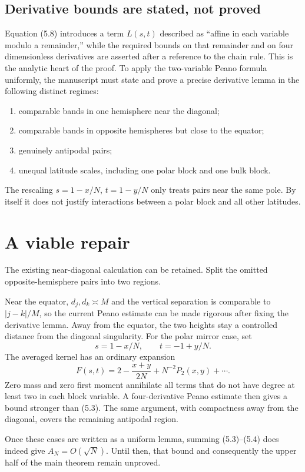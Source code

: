 \documentclass[11pt]{article}
\begin{document}
\subsection{Derivative bounds are stated, not proved}

Equation (5.8) introduces a term $L(s,t)$ described as ``affine in each
variable modulo a remainder,'' while the required bounds on that remainder
and on four dimensionless derivatives are asserted after a reference to the
chain rule.  This is the analytic heart of the proof.  To apply the
two-variable Peano formula uniformly, the manuscript must state and prove a
precise derivative lemma in the following distinct regimes:
\begin{enumerate}
\item comparable bands in one hemisphere near the diagonal;
\item comparable bands in opposite hemispheres but close to the equator;
\item genuinely antipodal pairs;
\item unequal latitude scales, including one polar block and one bulk block.
\end{enumerate}
The rescaling $s=1-x/N$, $t=1-y/N$ only treats pairs near the same pole.  By
itself it does not justify interactions between a polar block and all other
latitudes.

\section{A viable repair}

The existing near-diagonal calculation can be retained.  Split the omitted
opposite-hemisphere pairs into two regions.

Near the equator, $d_j,d_k\asymp M$ and the vertical separation is comparable
to $|j-k|/M$, so the current Peano estimate can be made rigorous after fixing
the derivative lemma.  Away from the equator, the two heights stay a
controlled distance from the diagonal singularity.  For the polar mirror
case, set
\[
 s=1-x/N,\qquad t=-1+y/N.
\]
The averaged kernel has an ordinary expansion
\[
 F(s,t)=2-\frac{x+y}{2N}+N^{-2}P_2(x,y)+\cdots.
\]
Zero mass and zero first moment annihilate all terms that do not have degree
at least two in each block variable.  A four-derivative Peano estimate then
gives a bound stronger than (5.3).  The same argument, with compactness away
from the diagonal, covers the remaining antipodal region.

Once these cases are written as a uniform lemma, summing (5.3)--(5.4) does
indeed give $A_N=O(\sqrt N)$.  Until then, that bound and consequently the
upper half of the main theorem remain unproved.
\end{document}
